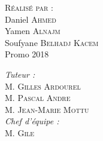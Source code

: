 \documentclass[
10pt, %
a4paper, %
oneside, %
headinclude,footinclude, %
BCOR5mm, %
]{report}
\begin{document}
\begin{titlepage}
\begin{sffamily}
\begin{center}
				\begin{minipage}{\textwidth}
					\begin{flushleft} \large
						\textsc{\Large Réalisé par : } \\
						Daniel \textsc{Ahmed}\\
						Yamen \textsc{Alnajm}\\
						Soufyane \textsc{Belhadj Kacem}\\
						Promo 2018\\
					\end{flushleft}
				\end{minipage}
				\begin{minipage}{\textwidth}
					\begin{flushright} \large
						\emph{Tuteur :} \\
						M. \textsc{Gilles Ardourel}\\
						M. \textsc{Pascal Andre}\\
						M. \textsc{Jean-Marie Mottu}\\
						\emph{Chef d'équipe : } \\
						M. \textsc{Gile}
					\end{flushright}
				\end{minipage}
																																																								
				\vfill
																																																								
																																																								
			\end{center}
		\end{sffamily}
	\end{titlepage}
								  
												
	\renewcommand{\sectionmark}[1]{\markright{\spacedlowsmallcaps{#1}}} %
	\renewcommand{\subsectionmark}[1]{\markright{\thesubsection~#1}} %
	\lehead{\mbox{\llap{\small\thepage\kern1em\color{halfgray} \vline}\color{halfgray}\hspace{0.5em}\rightmark\hfil}} %
														
\end{document}
